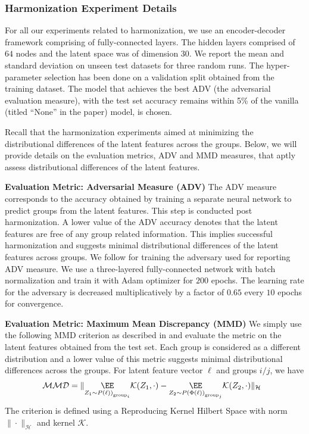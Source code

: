 \subsubsection{Harmonization Experiment Details}
For all our experiments related to harmonization, we use an encoder-decoder framework comprising of fully-connected layers. The hidden layers comprised of $64$ nodes and the latent space was of dimension $30$. We report the mean and standard deviation on unseen test datasets for three random runs. The hyper-parameter selection has been done on a validation split obtained from the training dataset. The model that achieves the best ADV (the adversarial evaluation measure), with the test set accuracy remains within 5\% of the vanilla (titled ``None'' in the paper) model, is chosen. 

Recall that the harmonization experiments aimed at minimizing the distributional differences of the latent features across the groups. Below, we will provide details on the evaluation metrics, ADV and MMD measures, that aptly assess distributional differences of the latent features. 

{\bf Evaluation Metric: Adversarial Measure (ADV)}
The ADV measure corresponds to the accuracy obtained by training a separate neural network to predict groups from the latent features. This step is conducted post harmonization. A lower value of the ADV accuracy denotes that the latent features are free of any group related information. This implies successful harmonization and suggests minimal distributional differences of the latent features across groups. We follow \citep{cai} for training the adversary used for reporting ADV measure. We use a three-layered fully-connected network with batch normalization and train it with Adam optimizer for $200$ epochs. The learning rate for the adversary is decreased multiplicatively by a factor of $0.65$ every $10$ epochs for convergence. 


{\bf Evaluation Metric: Maximum Mean Discrepancy (MMD)}
We simply use the following MMD criterion as described in \citep{gretton2006kernel} and evaluate the metric on the latent features obtained from the test set. Each group is considered as a different distribution and a lower value of this metric suggests minimal distributional differences across the groups. For latent feature vector $\ell$ and groups $i/j$, we have 
\begin{align}
\label{mmd_eq}
    \hspace{-0.1in} \mathcal{MMD} = \|\underset{Z_1\sim P\left(\ell)\right)_{\text{group}_i}}{\EE} \mathcal{K}(Z_1, \cdot) - \underset{Z_2\sim P\left(\Phi(\ell)\right)_{\text{group}_j}}{\EE} \mathcal{K}(Z_2, \cdot)\|_{\mathcal{H}}
\end{align}
The criterion is defined using a Reproducing Kernel Hilbert Space with norm $\|\cdot\|_{\mathcal{H}}$ and kernel $\mathcal{K}$. 